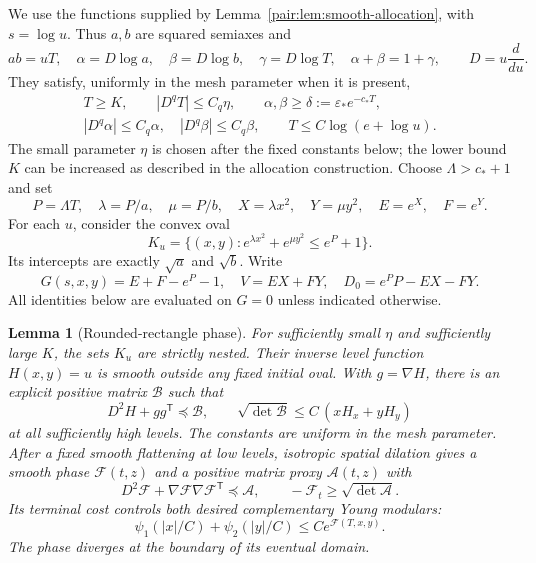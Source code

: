 \documentclass[11pt]{article}
\newtheorem{lemma}[theorem]{Lemma}
\numberwithin{equation}{section}
\begin{document}
We use the functions supplied by Lemma~\ref{pair:lem:smooth-allocation},
with $s=\log u$. Thus $a,b$ are squared semiaxes and
\[
 ab=uT,\quad \alpha=D\log a,\quad\beta=D\log b,\quad
 \gamma=D\log T,\quad\alpha+\beta=1+\gamma,
 \qquad D=u\frac d{du}.
\]
They satisfy, uniformly in the mesh parameter when it is present,
\begin{gather*}
 T\ge K,\qquad |D^qT|\le C_q\eta,\qquad
 \alpha,\beta\ge\delta:=\varepsilon_*e^{-c_*T},\\
 |D^q\alpha|\le C_q\alpha,\quad
 |D^q\beta|\le C_q\beta,
 \qquad T\le C\log(e+\log u).
\end{gather*}
The small parameter $\eta$ is chosen after the fixed constants below;
the lower bound $K$ can be increased as described in the allocation
construction. Choose $\Lambda>c_*+1$ and set
\[
 P=\Lambda T,\quad \lambda=P/a,\quad\mu=P/b,
 \quad X=\lambda x^2,\quad Y=\mu y^2,
 \quad E=e^X,\quad F=e^Y.
\]
For each $u$, consider the convex oval
\begin{equation}\label{pair:eq:rounded-level}
 K_u=\{(x,y):e^{\lambda x^2}+e^{\mu y^2}\le e^P+1\}.
\end{equation}
Its intercepts are exactly $\sqrt a$ and $\sqrt b$. Write
\[
 G(s,x,y)=E+F-e^P-1,
 \quad V=EX+FY,\quad
 D_0=e^P P-EX-FY.
\]
All identities below are evaluated on $G=0$ unless indicated otherwise.

\begin{lemma}[Rounded-rectangle phase]
\label{pair:lem:rounded-phase}
For sufficiently small $\eta$ and sufficiently large $K$, the sets
$K_u$ are strictly nested. Their inverse level function $H(x,y)=u$
is smooth outside any fixed initial oval. With
$g=\nabla H$, there is an explicit positive matrix $\mathcal B$ such
that
\begin{equation}\label{pair:eq:rounded-proxy}
 D^2H+g g^{\mathsf T}\preceq\mathcal B,
 \qquad
 \sqrt{\det\mathcal B}\le C\,(xH_x+yH_y)
\end{equation}
at all sufficiently high levels. The constants are uniform in the mesh
parameter. After a fixed smooth flattening at low levels, isotropic
spatial dilation gives a smooth phase $\mathcal F(t,z)$ and a positive
matrix proxy $\mathcal A(t,z)$ with
\begin{equation}\label{pair:eq:rounded-supersolution}
 D^2\mathcal F+\nabla\mathcal F\nabla\mathcal F^{\mathsf T}
 \preceq\mathcal A,
 \qquad -\mathcal F_t\ge\sqrt{\det\mathcal A}.
\end{equation}
Its terminal cost controls both desired complementary Young modulars:
\begin{equation}\label{pair:eq:rounded-terminal}
 \psi_1(|x|/C)+\psi_2(|y|/C)\le C e^{\mathcal F(T,x,y)}.
\end{equation}
The phase diverges at the boundary of its eventual domain.
\end{lemma}
\end{document}
